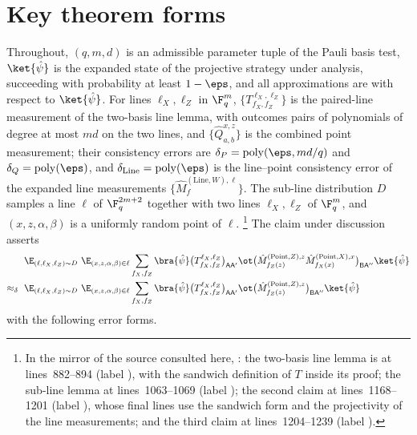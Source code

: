 \documentclass[11pt]{article}
\DeclareMathOperator{\poly}{poly}
\begin{document}
\section{Key theorem forms}

Throughout, $(q,m,d)$ is an admissible parameter tuple of the Pauli basis
test, $\ket{\hat\psi}$ is the expanded state of the projective strategy
under analysis, succeeding with probability at least $1-\eps$, and all
approximations are with respect to $\ket{\hat\psi}$.  For lines
$\ell_X, \ell_Z$ in $\F_q^m$, $\{T^{\ell_X,\ell_Z}_{f_X,f_Z}\}$ is the
paired-line measurement of the two-basis line lemma, with outcomes pairs
of polynomials of degree at most $md$ on the two lines, and
$\{\hat Q^{x,z}_{a,b}\}$ is the combined point measurement; their
consistency errors are $\delta_P = \poly(\eps, md/q)$ and
$\delta_Q = \poly(\eps)$, and $\delta_{\mathrm{Line}} = \poly(\eps)$ is the
line--point consistency error of the expanded line measurements
$\{\hat M^{(\mathrm{Line},W),\ell}_f\}$.  The sub-line distribution $D$ samples
a line $\ell$ of $\F_q^{2m+2}$ together with two lines $\ell_X, \ell_Z$ of
$\F_q^m$, and $(x,z,\alpha,\beta)$ is a uniformly random point of
$\ell$.%
\footnote{In the mirror of the source consulted here,
: the
two-basis line lemma is at lines~882--894 (label ),
with the sandwich definition of $T$ inside its proof; the sub-line lemma at
lines~1063--1069 (label ); the second claim at
lines~1168--1201 (label ), whose final lines use the
sandwich form and the projectivity of the line measurements; and the third
claim at lines~1204--1239 (label ).}
The claim under discussion asserts
\begin{align*}
  \E_{(\ell,\ell_X,\ell_Z) \sim D}\ \E_{(x,z,\alpha,\beta) \in \ell}
  &\sum_{f_X,f_Z} \bra{\hat\psi}
  \big(T^{\ell_X,\ell_Z}_{f_X,f_Z}\big)_{\mathsf{A}\mathsf{A}'} \ot
  \big(\hat{M}^{(\mathrm{Point},Z),z}_{f_Z(z)}
  \hat{M}^{(\mathrm{Point},X),x}_{f_X(x)}\big)_{\mathsf{B}\mathsf{A}''}
  \ket{\hat\psi} \\
  \approx_{\delta}\
  \E_{(\ell,\ell_X,\ell_Z) \sim D}\ \E_{(x,z,\alpha,\beta) \in \ell}
  &\sum_{f_X,f_Z} \bra{\hat\psi}
  \big(T^{\ell_X,\ell_Z}_{f_X,f_Z}\big)_{\mathsf{A}\mathsf{A}'} \ot
  \big(\hat{M}^{(\mathrm{Point},Z),z}_{f_Z(z)}\big)_{\mathsf{B}\mathsf{A}''}
  \ket{\hat\psi}
\end{align*}
with the following error forms.
\end{document}

